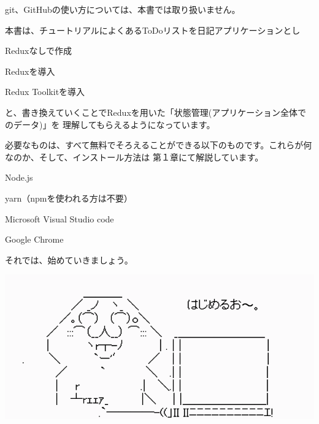 \vspace*{\baselineskip}

git、GitHubの使い方については、本書では取り扱いません。

\vspace*{\baselineskip}

本書は、チュートリアルによくあるToDoリストを日記アプリケーションとし

\begin{starterenumerate}
\item Reduxなしで作成
\item Reduxを導入
\item Redux Toolkitを導入
\end{starterenumerate}

と、書き換えていくことでReduxを用いた「状態管理(アプリケーション全体でのデータ)」を
理解してもらえるようになっています。

\vspace*{\baselineskip}

必要なものは、すべて無料でそろえることができる以下のものです。これらが何なのか、そして、インストール方法は
第１章にて解説しています。

\begin{starteritemize}
\item Node.js
\item yarn（npmを使われる方は不要）
\item Microsoft Visual Studio code
\item Google Chrome
\end{starteritemize}

\vspace*{\baselineskip}

それでは、始めていきましょう。

\begin{reviewimage}%
\includegraphics[width=1.0\maxwidth]{./images/00-preface/greetings04.png}%
\label{image:00-preface:greetings04}
\end{reviewimage}

